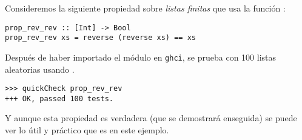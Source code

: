 Consideremos la siguiente propiedad sobre \textit{listas finitas} que usa la 
función :
\begin{verbatim}
prop_rev_rev :: [Int] -> Bool
prop_rev_rev xs = reverse (reverse xs) == xs
\end{verbatim}

Después de haber importado el módulo  en \texttt{ghci}, 
se prueba con 100 listas aleatorias usando 
.
\begin{verbatim}
>>> quickCheck prop_rev_rev
+++ OK, passed 100 tests.
\end{verbatim}

Y aunque esta propiedad es verdadera (que se demostrará enseguida) se puede 
ver lo útil y práctico que es {\QuickCheck} en este ejemplo.

